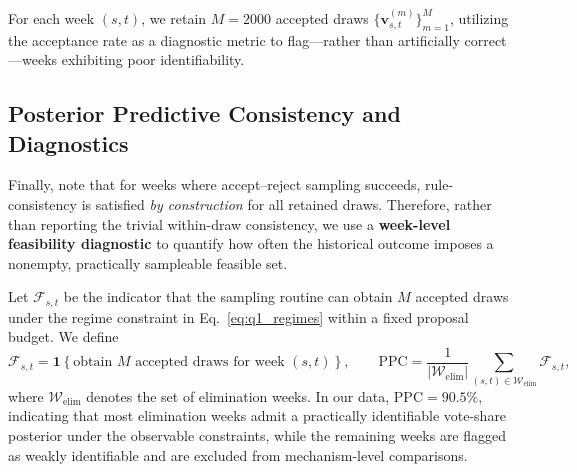 
For each week $(s,t)$, we retain $M=2000$ accepted draws $\{\mathbf v^{(m)}_{s,t}\}_{m=1}^M$, utilizing the acceptance rate as a diagnostic metric to flag—rather than artificially correct—weeks exhibiting poor identifiability.

\subsection{Posterior Predictive Consistency and Diagnostics }
\label{sec:q1_val}

Finally, note that for weeks where accept--reject sampling succeeds, rule-consistency is satisfied \emph{by construction} for all retained draws. Therefore, rather than reporting the trivial within-draw consistency, we use a \textbf{week-level feasibility diagnostic} to quantify how often the historical outcome imposes a nonempty, practically sampleable feasible set.

Let $\mathcal{F}_{s,t}$ be the indicator that the sampling routine can obtain $M$ accepted draws under the regime constraint in Eq.~\eqref{eq:q1_regimes} within a fixed proposal budget. We define
\[
\mathcal{F}_{s,t}=\mathbf 1\!\left\{\text{obtain }M\text{ accepted draws for week }(s,t)\right\},
\qquad
\mathrm{PPC}=\frac{1}{|\mathcal{W}_{\mathrm{elim}}|}\sum_{(s,t)\in \mathcal{W}_{\mathrm{elim}}}\mathcal{F}_{s,t},
\]
where $\mathcal{W}_{\mathrm{elim}}$ denotes the set of elimination weeks. In our data, $\mathrm{PPC}=\mathbf{90.5\%}$, indicating that most elimination weeks admit a practically identifiable vote-share posterior under the observable constraints, while the remaining weeks are flagged as weakly identifiable and are excluded from mechanism-level comparisons.

